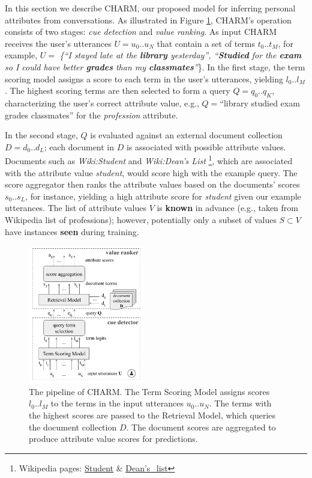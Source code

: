 
In this section we describe CHARM, our proposed model for inferring personal attributes from conversations. As illustrated in Figure \ref{pipeline}, CHARM's operation consists of two stages: \emph{cue detection} and \emph{value ranking}. 
As input CHARM receives the user's utterances $U=u_0..u_N$ that contain a set of terms $t_0..t_M$, for example, $U=${\em 
\{``I stayed late at the \textbf{library} yesterday'', ``\textbf{Studied} for the \textbf{exam} so I could have better \textbf{grades} than my \textbf{classmates}''}\}. 
In the first stage, the term scoring model assigns a score to each term in the user's utterances, yielding $l_0..l_M$. The highest scoring terms are then selected to form a query $Q=q_0..q_K$, characterizing the user's correct attribute value, e.g., $Q=$``library studied exam grades classmates'' for the \emph{profession} attribute. 

In the second stage, $Q$ is evaluated against an external document collection $D=d_0..d_L$; each document in $D$ is associated with possible attribute values.  
Documents such as \emph{Wiki:Student} and \emph{Wiki:Dean's List}
\footnote{Wikipedia pages: \href{https://en.wikipedia.org/wiki/Student}{{Student}} \& \href{https://en.wikipedia.org/wiki/Dean\%27s_list}{{Dean's\_list}}}, which are associated with the attribute value \emph{student}, would score high with the example query.
The score aggregator then ranks the attribute values based on the documents' scores $s_0..s_L$, for instance, yielding a high attribute score for \emph{student} given our example utterances. The list of attribute values $V$ is \textbf{known} in advance (e.g., taken from Wikipedia list of professions); however, potentially only a subset of values $S \subset V$ have instances \textbf{seen} during training.


\begin{figure}[t!]
\centering
\includegraphics[width=0.45\textwidth]{imgs/scheme.png}
\vspace*{-0.3cm}
\caption[The pipeline of CHARM.]{The pipeline of CHARM.
The Term Scoring Model assigns scores $l_0 .. l_M$ to the terms in the input utterances $u_0..u_N$. The terms with the highest scores are passed to the Retrieval Model, which queries the document collection $D$. The document scores are aggregated to produce attribute value scores
for predictions.
}
\label{pipeline}
\end{figure}

